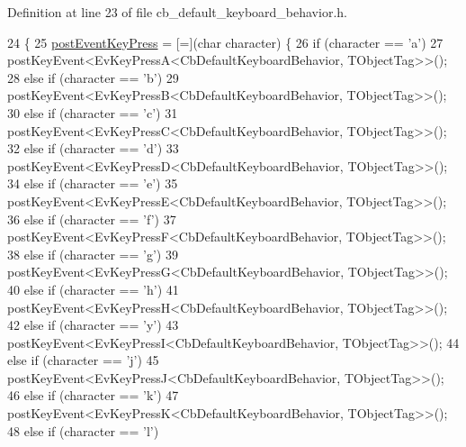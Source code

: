 Definition at line 23 of file cb\+\_\+default\+\_\+keyboard\+\_\+behavior.\+h.


\begin{DoxyCode}
24     \{
25         \hyperlink{classcl__keyboard_1_1CbDefaultKeyboardBehavior_abd29833a0f94aa1d5aa1834d15ab1281}{postEventKeyPress} = [=](\textcolor{keywordtype}{char} character) \{
26             \textcolor{keywordflow}{if} (character == \textcolor{charliteral}{'a'})
27                 postKeyEvent<EvKeyPressA<CbDefaultKeyboardBehavior, TObjectTag>>();
28             \textcolor{keywordflow}{else} \textcolor{keywordflow}{if} (character == \textcolor{charliteral}{'b'})
29                 postKeyEvent<EvKeyPressB<CbDefaultKeyboardBehavior, TObjectTag>>();
30             \textcolor{keywordflow}{else} \textcolor{keywordflow}{if} (character == \textcolor{charliteral}{'c'})
31                 postKeyEvent<EvKeyPressC<CbDefaultKeyboardBehavior, TObjectTag>>();
32             \textcolor{keywordflow}{else} \textcolor{keywordflow}{if} (character == \textcolor{charliteral}{'d'})
33                 postKeyEvent<EvKeyPressD<CbDefaultKeyboardBehavior, TObjectTag>>();
34             \textcolor{keywordflow}{else} \textcolor{keywordflow}{if} (character == \textcolor{charliteral}{'e'})
35                 postKeyEvent<EvKeyPressE<CbDefaultKeyboardBehavior, TObjectTag>>();
36             \textcolor{keywordflow}{else} \textcolor{keywordflow}{if} (character == \textcolor{charliteral}{'f'})
37                 postKeyEvent<EvKeyPressF<CbDefaultKeyboardBehavior, TObjectTag>>();
38             \textcolor{keywordflow}{else} \textcolor{keywordflow}{if} (character == \textcolor{charliteral}{'g'})
39                 postKeyEvent<EvKeyPressG<CbDefaultKeyboardBehavior, TObjectTag>>();
40             \textcolor{keywordflow}{else} \textcolor{keywordflow}{if} (character == \textcolor{charliteral}{'h'})
41                 postKeyEvent<EvKeyPressH<CbDefaultKeyboardBehavior, TObjectTag>>();
42             \textcolor{keywordflow}{else} \textcolor{keywordflow}{if} (character == \textcolor{charliteral}{'y'})
43                 postKeyEvent<EvKeyPressI<CbDefaultKeyboardBehavior, TObjectTag>>();
44             \textcolor{keywordflow}{else} \textcolor{keywordflow}{if} (character == \textcolor{charliteral}{'j'})
45                 postKeyEvent<EvKeyPressJ<CbDefaultKeyboardBehavior, TObjectTag>>();
46             \textcolor{keywordflow}{else} \textcolor{keywordflow}{if} (character == \textcolor{charliteral}{'k'})
47                 postKeyEvent<EvKeyPressK<CbDefaultKeyboardBehavior, TObjectTag>>();
48             \textcolor{keywordflow}{else} \textcolor{keywordflow}{if} (character == \textcolor{charliteral}{'l'})

\end{DoxyCode}
